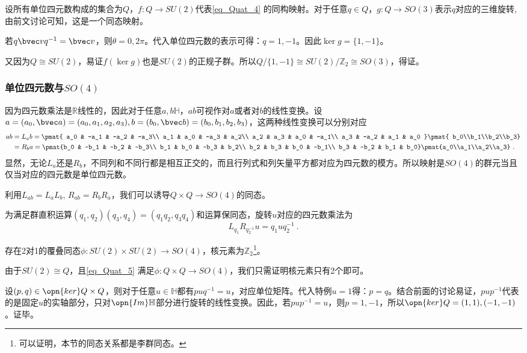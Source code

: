 设所有单位四元数构成的集合为$Q$，$f:Q\to SU(2)$代表\autoref{eq_Quat_4} 的同构映射。对于任意$q\in Q$，$g:Q\to SO(3)$表示$q$对应的三维旋转,由前文讨论可知，这是一个同态映射。

若$q\bvec vq^{-1}=\bvec v$，则$\theta=0,2\pi$。代入单位四元数的表示可得：$q=1,-1$。因此$\ker g=\{1,-1\}$。

又因为$Q\cong SU(2)$，易证$f(\ker g)$也是$SU(2)$的正规子群。所以$Q/\{1,-1\}\cong SU(2)/\mathbb Z_2\cong SO(3)$，得证。
\subsubsection{单位四元数与$SO(4)$}
因为四元数乘法是$\mathbb R$线性的，因此对于任意$a,b\mathbb H$，$ab$可视作对$a$或者对$b$的线性变换。设$a=(a_0,\bvec a)=(a_0,a_1,a_2,a_3),b=(b_0,\bvec b)=(b_0,b_1,b_2,b_3)$，这两种线性变换可以分别对应
\begin{equation}
\begin{aligned}
ab &=L_ab= \pmat{
a_0 & -a_1 & -a_2 & -a_3\\
a_1 & a_0 & -a_3 & a_2\\
a_2 & a_3 & a_0 & -a_1\\
a_3 & -a_2 & a_1 & a_0
}\pmat{
b_0\\b_1\\b_2\\b_3}\\
&= R_ba=\pmat{b_0 & -b_1 & -b_2 & -b_3\\
b_1 & b_0 & -b_3 & b_2\\
b_2 & b_3 & b_0 & -b_1\\
b_3 & -b_2 & b_1 & b_0}\pmat{a_0\\a_1\\a_2\\a_3}~.
\end{aligned}
\end{equation}
显然，无论$L_a$还是$R_b$，不同列和不同行都是相互正交的，而且行列式和列矢量平方都对应为四元数的模方。所以映射是$SO(4)$的群元当且仅当对应的四元数是单位四元数。

利用$L_{ab}=L_aL_b,\,R_{ab}=R_bR_a$，我们可以诱导$Q\times Q\to SO(4)$的同态。

为满足群直积运算$(q_1,q_2)(q_3,q_4)=(q_1q_2,q_3q_4)$和运算保同态，旋转$u$对应的四元数乘法为
\begin{equation}\label{eq_Quat_5}
L_{q_1}R_{q_2^{-1}}u=q_1uq_2^{-1}~.
\end{equation}
\begin{theorem}{}\label{the_Quat_1}
存在2对1的覆叠同态$\phi:SU(2)\times SU(2)\to SO(4)$，核元素为$\mathbb Z_2$\footnote{可以证明，本节的同态关系都是李群同态。}。
\end{theorem}

由于$SU(2)\cong Q$，且\autoref{eq_Quat_5} 满足$\phi:Q\times Q\to SO(4)$，我们只需证明核元素只有2个即可。

设$(p,q)\in \opn{ker}Q\times Q$，则对于任意$u\in \mathbb H$都有$puq^{-1}=u$，对应单位矩阵。代入特例$u=1$得：$p=q$。结合前面的讨论易证，$pup^{-1}$代表的是固定$u$的实轴部分，只对$\opn{Im}\mathbb H$部分进行旋转的线性变换。因此，若$pup^{-1}=u$，则$p=1,-1$，所以$\opn{ker}Q=(1,1),(-1,-1)$。证毕。
